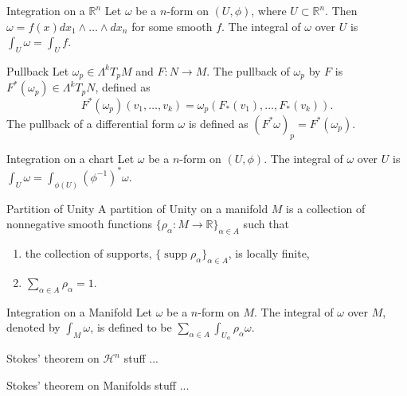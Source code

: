 \documentclass[9pt]{beamer}
\DeclareMathOperator{\supp}{supp}
\begin{document}
\begin{frame}
    \begin{block}{Integration on a $\mathbb{R}^n$}
        Let $\omega$ be a $n$-form on $(U, \phi)$, where $U\subset\mathbb{R}^n$. Then $\omega=f(x)dx_1\wedge\dots\wedge dx_n$ for some smooth $f$. The integral of $\omega$ over $U$ is $\int_U\omega=\int_U f$.
    \end{block}

    \begin{block}{Pullback}
        Let $\omega_p\in \Lambda^kT_pM$ and $F:N \rightarrow  M$. The pullback of $\omega_p$ by $F$ is $F^*(\omega_p)\in \Lambda^kT_pN$, defined as \[F^*(\omega_p)(v_1,\dots,v_k)=\omega_p(F_*(v_1),\dots, F_*(v_k)).\]
        The pullback of a differential form $\omega$ is defined as $(F^*\omega)_p=F^*(\omega_p)$.
    \end{block}

    \begin{block}{Integration on a chart}
        Let $\omega$ be a $n$-form on $(U, \phi)$. The integral of $\omega$ over $U$ is $\int_U\omega=\int_{\phi(U)}(\phi^{-1})^*\omega$. 
    \end{block}
\end{frame}

\begin{frame}
    \begin{block}{Partition of Unity}
        A partition of Unity on a manifold $M$ is a collection of nonnegative smooth functions $\{\rho_\alpha:M \rightarrow \mathbb{R}\}_{\alpha\in A}$ such that \begin{enumerate}[i]
            \item the collection of supports, $\{\supp\rho_\alpha\}_{\alpha\in A}$, is locally finite,
            \item $\sum_{\alpha\in A} \rho_\alpha = 1.$
        \end{enumerate}
    \end{block}

    \begin{block}{Integration on a Manifold}
        Let $\omega$ be a $n$-form on $M$. The integral of $\omega$ over $M$, denoted by $\int_M \omega$, is defined to be $\sum_{\alpha\in A}\int_{U_\alpha}\rho_\alpha\omega$.
    \end{block}
\end{frame}

\begin{frame}
    \begin{block}{Stokes' theorem on $\mathcal{H}^n$}
        stuff ...
    \end{block}
\end{frame}

\begin{frame}
    \begin{block}{Stokes' theorem on Manifolds}
        stuff ...
    \end{block}
\end{frame}
\end{document}
